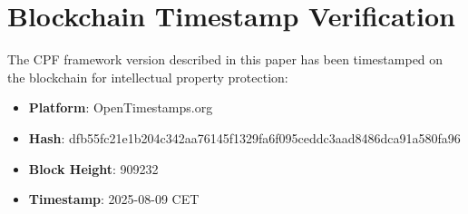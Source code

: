 \documentclass[manuscript,screen,review]{acmart}
\begin{document}
\section{Blockchain Timestamp Verification}
\label{app:blockchain}

The CPF framework version described in this paper has been timestamped on the blockchain for intellectual property protection:

\begin{itemize}
\item \textbf{Platform}: OpenTimestamps.org
\item \textbf{Hash}: dfb55fc21e1b204c342aa76145f1329fa6f095ceddc3aad8486dca91a580fa96
\item \textbf{Block Height}: 909232
\item \textbf{Timestamp}: 2025-08-09 CET
\end{itemize}

\end{document}
